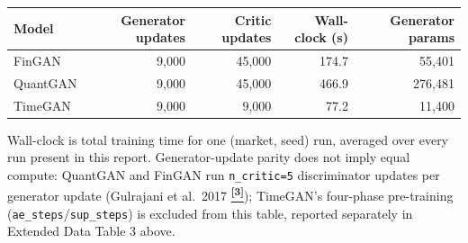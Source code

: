 \documentclass[10pt]{article}
\newcommand{\tcite}[1]{%
  \hyperlink{R:#1}{\textsuperscript{\scriptsize\textbf{[#1]}}}}
\begin{document}
\vspace{4pt}
{\small
\begin{tabular}{@{}lrrrr@{}}
\toprule
Model & Generator updates & Critic updates & Wall-clock (s) & Generator params \\
\midrule
FinGAN & 9,000 & 45,000 & 174.7 & 55,401 \\
QuantGAN & 9,000 & 45,000 & 466.9 & 276,481 \\
TimeGAN & 9,000 & 9,000 & 77.2 & 11,400 \\
\bottomrule
\end{tabular}}

\smallskip
{\small Wall-clock is total training time for one (market, seed) run, averaged over every run present in this report. Generator-update parity does not imply equal compute: QuantGAN and FinGAN run \texttt{n\_critic=5} discriminator updates per generator update (Gulrajani et al.\ 2017\tcite{3}); TimeGAN's four-phase pre-training (\texttt{ae\_steps}/\texttt{sup\_steps}) is excluded from this table, reported separately in Extended Data Table 3 above.}
\end{document}
